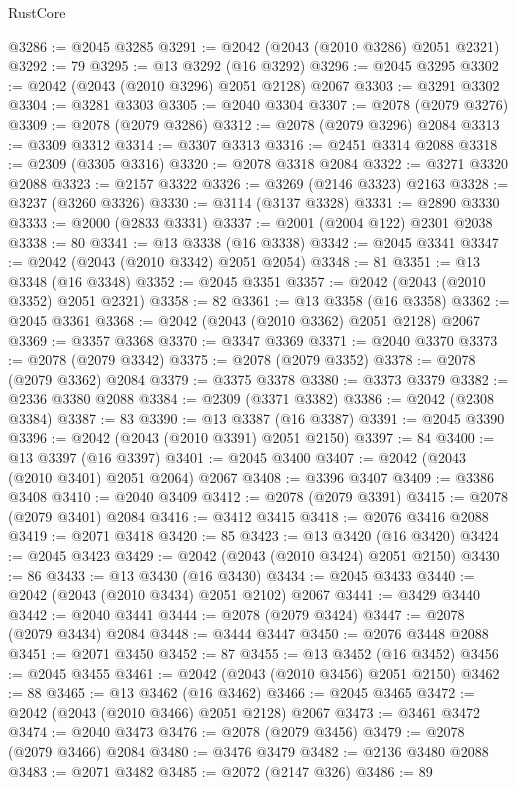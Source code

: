 \begin{lexlean}{RustCore}
\begin{coremodule}
@3286 := @2045 @3285
@3291 := @2042 (@2043 (@2010 @3286) @2051 @2321)
@3292 := 79
@3295 := @13 @3292 (@16 @3292)
@3296 := @2045 @3295
@3302 := @2042 (@2043 (@2010 @3296) @2051 @2128) @2067
@3303 := @3291 @3302
@3304 := @3281 @3303
@3305 := @2040 @3304
@3307 := @2078 (@2079 @3276)
@3309 := @2078 (@2079 @3286)
@3312 := @2078 (@2079 @3296) @2084
@3313 := @3309 @3312
@3314 := @3307 @3313
@3316 := @2451 @3314 @2088
@3318 := @2309 (@3305 @3316)
@3320 := @2078 @3318 @2084
@3322 := @3271 @3320 @2088
@3323 := @2157 @3322
@3326 := @3269 (@2146 @3323) @2163
@3328 := @3237 (@3260 @3326)
@3330 := @3114 (@3137 @3328)
@3331 := @2890 @3330
@3333 := @2000 (@2833 @3331)
@3337 := @2001 (@2004 @122) @2301 @2038
@3338 := 80
@3341 := @13 @3338 (@16 @3338)
@3342 := @2045 @3341
@3347 := @2042 (@2043 (@2010 @3342) @2051 @2054)
@3348 := 81
@3351 := @13 @3348 (@16 @3348)
@3352 := @2045 @3351
@3357 := @2042 (@2043 (@2010 @3352) @2051 @2321)
@3358 := 82
@3361 := @13 @3358 (@16 @3358)
@3362 := @2045 @3361
@3368 := @2042 (@2043 (@2010 @3362) @2051 @2128) @2067
@3369 := @3357 @3368
@3370 := @3347 @3369
@3371 := @2040 @3370
@3373 := @2078 (@2079 @3342)
@3375 := @2078 (@2079 @3352)
@3378 := @2078 (@2079 @3362) @2084
@3379 := @3375 @3378
@3380 := @3373 @3379
@3382 := @2336 @3380 @2088
@3384 := @2309 (@3371 @3382)
@3386 := @2042 (@2308 @3384)
@3387 := 83
@3390 := @13 @3387 (@16 @3387)
@3391 := @2045 @3390
@3396 := @2042 (@2043 (@2010 @3391) @2051 @2150)
@3397 := 84
@3400 := @13 @3397 (@16 @3397)
@3401 := @2045 @3400
@3407 := @2042 (@2043 (@2010 @3401) @2051 @2064) @2067
@3408 := @3396 @3407
@3409 := @3386 @3408
@3410 := @2040 @3409
@3412 := @2078 (@2079 @3391)
@3415 := @2078 (@2079 @3401) @2084
@3416 := @3412 @3415
@3418 := @2076 @3416 @2088
@3419 := @2071 @3418
@3420 := 85
@3423 := @13 @3420 (@16 @3420)
@3424 := @2045 @3423
@3429 := @2042 (@2043 (@2010 @3424) @2051 @2150)
@3430 := 86
@3433 := @13 @3430 (@16 @3430)
@3434 := @2045 @3433
@3440 := @2042 (@2043 (@2010 @3434) @2051 @2102) @2067
@3441 := @3429 @3440
@3442 := @2040 @3441
@3444 := @2078 (@2079 @3424)
@3447 := @2078 (@2079 @3434) @2084
@3448 := @3444 @3447
@3450 := @2076 @3448 @2088
@3451 := @2071 @3450
@3452 := 87
@3455 := @13 @3452 (@16 @3452)
@3456 := @2045 @3455
@3461 := @2042 (@2043 (@2010 @3456) @2051 @2150)
@3462 := 88
@3465 := @13 @3462 (@16 @3462)
@3466 := @2045 @3465
@3472 := @2042 (@2043 (@2010 @3466) @2051 @2128) @2067
@3473 := @3461 @3472
@3474 := @2040 @3473
@3476 := @2078 (@2079 @3456)
@3479 := @2078 (@2079 @3466) @2084
@3480 := @3476 @3479
@3482 := @2136 @3480 @2088
@3483 := @2071 @3482
@3485 := @2072 (@2147 @326)
@3486 := 89

\end{coremodule}
\end{lexlean}
